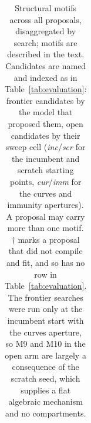 \documentclass[11pt]{article}
\begin{document}
\begin{table}
\begin{tabular}{l p{} p{}}
\bottomrule
\end{tabular}
  \caption{Structural motifs across all proposals, disaggregated by search; motifs are described in the text. Candidates are named and indexed as in Table~\ref{tab:evaluation}: frontier candidates by the model that proposed them, open candidates by their sweep cell (\emph{inc}/\emph{scr} for the incumbent and scratch starting points, \emph{cur}/\emph{imm} for the curves and immunity apertures). A proposal may carry more than one motif. $\dagger$ marks a proposal that did not compile and fit, and so has no row in Table~\ref{tab:evaluation}. The frontier searches were run only at the incumbent start with the curves aperture, so M9 and M10 in the open arm are largely a consequence of the scratch seed, which supplies a flat algebraic mechanism and no compartments.}
  \label{tab:motifs}
\end{table}

\end{document}
